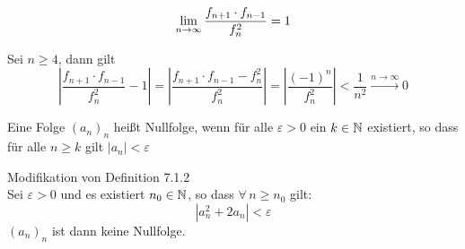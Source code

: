 \documentclass[../ana1u.tex]{subfiles}
\begin{document}
\begin{beh}[2]
    \[\lim\limits_{n\rightarrow\infty} \frac{f_{n+1} \cdot f_{n-1}}{f_n^2} = 1\]
\end{beh}
\begin{bew}
    Sei \(n \geq 4\), dann gilt
    \[\left|\frac{f_{n+1} \cdot f_{n-1}}{f_n^2} - 1\right| = \left|\frac{f_{n+1} \cdot f_{n-1} - f_n^2}{f_n^2}\right| = \left|\frac{(-1)^n}{f_n^2}\right| < \frac{1}{n^2} \overset{n \rightarrow \infty}{\rightarrow} 0\]
\end{bew}
\begin{defi}
    Eine Folge \((a_n)_n\) heißt Nullfolge, wenn für alle \(\varepsilon > 0\) ein \(k \in \mathbb{N}\) existiert, so dass für alle \(n \geq k\) gilt \(|a_n| < \varepsilon\)
\end{defi}
\begin{defi}
    Modifikation von Definition 7.1.2\\
    Sei \(\varepsilon > 0\) und es existiert \(n_0 \in \mathbb{N}\), so dass \(\forall \, n \geq n_0\) gilt:
    \[|a_n^2 + 2a_n| < \varepsilon\]
    \((a_n)_n\) ist dann keine Nullfolge.
\end{defi}
\end{document}

